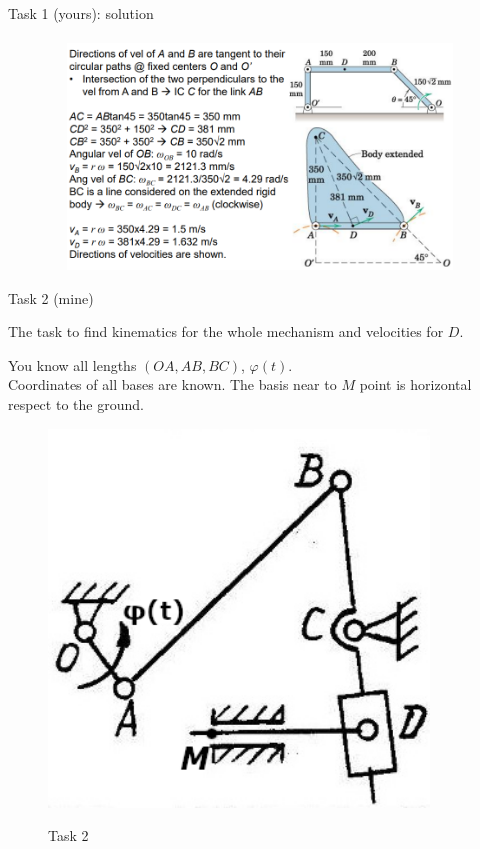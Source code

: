 \documentclass[aspectratio=169]{beamer}
\begin{document}
\begin{frame}[t]{Task 1 (yours): solution}
\framesubtitle{}
    \begin{figure}[H]
        \centering\includegraphics[height=6cm,width=1\textwidth,keepaspectratio]{image20.png}
        \label{fig:image20}
    \end{figure}
\end{frame}

\begin{frame}[t]{Task 2 (mine)}
\vspace{-0.4cm}
\begin{minipage}{0.55\textwidth}
The task to find kinematics for the whole mechanism and velocities for $D$.
\bigskip

You know all lengths $(OA, AB, BC)$, $\varphi(t)$. \\ Coordinates of all bases are known. The basis near to $M$ point is horizontal respect to the ground.
\end{minipage}
\begin{minipage}{0.42\textwidth}
        \begin{figure}[H]
    \includegraphics[width=0.9\textwidth]{lab4_task2_fig.png}\\
    \caption*{Task 2}
    \end{figure}
\end{minipage}
\end{frame}
\end{document}
